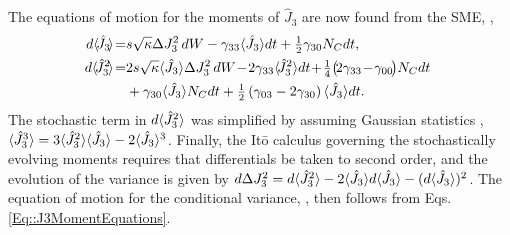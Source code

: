 \documentclass[aps,pra,twocolumn]{revtex4-1} %
\newcommand{\varz}{\Delta J_3^2}
\newcommand{\jz}{\hat{J}_3}
\begin{document}
\begin{appendix}
The equations of motion for the moments of $\jz$ are now found from the SME, ,
	\begin{subequations} \label{Eq::J3MomentEquations}
	\begin{align} 
		\!\!d \expt{\!\jz\!} \!=& s \sqrt{\kappa} \varz \, dW - \gamma_{33} \expt{\jz}dt + \smallfrac{1}{2} \gamma_{30} N_C dt ,  \\
		\!\!d \expt{\!\jz^2\!} \!=& 2 s\sqrt{\kappa} \expt{\jz}\Delta J_3^2 \, dW \!-\! 2 \gamma_{33} \expt{\!\jz^2}dt \!+\! \smallfrac{1}{4} \big(\! 2 \gamma_{33}\!-\!\gamma_{00}\!\big) N_C dt \nn\\
		&+ \gamma_{30} \expt{\jz} N_C dt + \smallfrac{1}{2}\left(\gamma_{03} -2 \gamma_{30}\right) \expt{\jz} dt. 
	\end{align}
	\end{subequations}
The stochastic term in $d\expt{\jz^2}$ was simplified by assuming Gaussian statistics \cite{jacobs_straightforward_2006}, $\expt{\jz^3} = 3\expt{\jz^2}\expt{\jz}- 2\expt{\jz}^3$. 
Finally, the It\={o} calculus governing the stochastically evolving moments requires that differentials be taken to second order, and the evolution of the variance is given by $d \varz = d \expt{\jz^2} - 2 \expt{\jz} d \expt{\jz} - ( d \expt{\jz} )^2$. 
The equation of motion for the conditional variance, , then follows from Eqs. \eqref{Eq::J3MomentEquations}.



\end{appendix}
\end{document}

